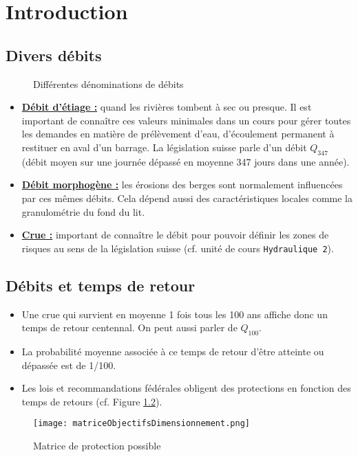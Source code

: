 \chapter{Introduction}

\section{Divers débits}
\begin{figure}[H]
    \centering
    \caption{Différentes dénominations de débits}
    \label{fig:debits}
\end{figure}

\begin{itemize}
    \item \underline{\textbf{Débit d'étiage :}} quand les rivières tombent à sec ou presque.
    Il est important de connaître ces valeurs minimales dans un cours pour gérer toutes les demandes en matière de prélèvement d'eau, d'écoulement permanent à restituer en aval d'un barrage.
    La législation suisse parle d'un débit $Q_{347}$ (débit moyen sur une journée dépassé en moyenne 347 jours dans une année).
    \item \underline{\textbf{Débit morphogène :}} les érosions des berges sont normalement influencées par ces mêmes débits. Cela dépend aussi des caractéristiques locales comme la granulométrie du fond du lit.
    \item \underline{\textbf{Crue :}} important de connaître le débit pour pouvoir définir les zones de risques au sens de la législation suisse (cf. unité de cours \texttt{Hydraulique 2}).
\end{itemize}

\section{Débits et temps de retour}
\begin{itemize}
    \item Une crue qui survient en moyenne 1 fois tous les 100 ans affiche donc un temps de retour centennal.
    On peut aussi parler de $Q_{100}$.
    \item La probabilité moyenne associée à ce temps de retour d'être atteinte ou dépassée est de 1/100.
    \item Les lois et recommandations fédérales obligent des protections en fonction des temps de retours (cf. Figure \ref{fig:matriceProtection}).
\end{itemize}
\begin{figure}[h!]
    \centering
    \texttt{[image: matriceObjectifsDimensionnement.png]}
    \caption{Matrice de protection possible}
    \label{fig:matriceProtection}
\end{figure}

